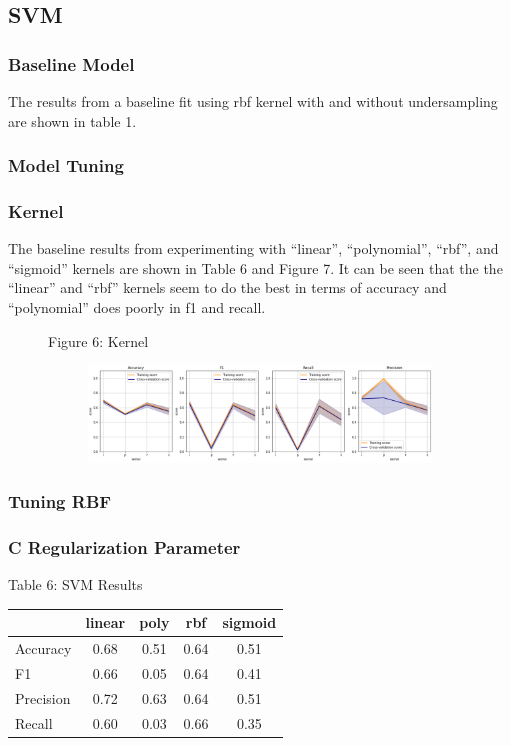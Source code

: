 \documentclass{article}
\begin{document}
\subsection{SVM}
\subsubsection*{Baseline Model}
The results from a baseline fit using rbf kernel with and without undersampling are shown in table 1. 

\subsubsection*{Model Tuning}
\subsubsection*{Kernel}
The baseline results from experimenting with ``linear'', ``polynomial'', ``rbf'', and ``sigmoid'' kernels are shown in Table 6 and Figure 7. It can be seen that the the ``linear'' and ``rbf'' kernels seem to do the best in terms of accuracy and ``polynomial'' does poorly in f1 and recall. 

\begin{figure}
	\centering
	Figure 6: Kernel\\
	\begin{subfigure}{\textwidth}
		\centering
		\includegraphics[width=\linewidth]{poland_svm_kernel.png}
		
	\end{subfigure}
	
	\label{fig:test}
\end{figure}

\subsubsection*{Tuning RBF}
\subsubsection*{C Regularization Parameter}


\begin{table}
	
	\centering
	Table 6: SVM Results \\
	\begin{tabular}{ l c c c c }
		\hline
		& linear & poly & rbf & sigmoid\\
		\hline
		Accuracy & 0.68 & 0.51 & 0.64 & 0.51 \\
		F1 & 0.66 & 0.05 & 0.64 & 0.41 \\
		Precision & 0.72 & 0.63 & 0.64 & 0.51  \\
		Recall & 0.60 & 0.03 & 0.66 & 0.35 \\
		\hline 
	\end{tabular}
\end{table}
\end{document}
